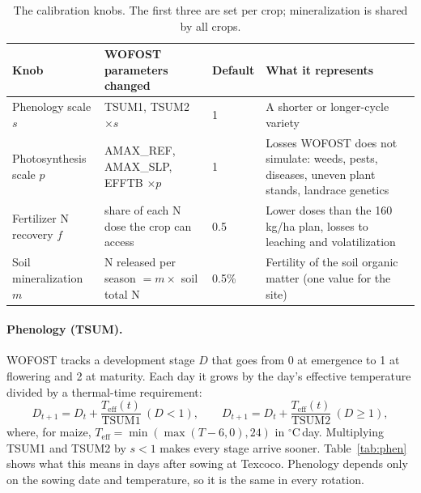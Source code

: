 \documentclass[11pt,a4paper]{article}
\begin{document}
\begin{table}[H]
\centering\small
\begin{tabularx}{\linewidth}{lllY}
\toprule
Knob & WOFOST parameters changed & Default & What it represents \\
\midrule
Phenology scale \(s\) & TSUM1, TSUM2 \(\times s\) & 1 & A shorter or longer-cycle variety \\
Photosynthesis scale \(p\) & AMAX\_REF, AMAX\_SLP, EFFTB \(\times p\) & 1 & Losses WOFOST does not simulate: weeds,
  pests, diseases, uneven plant stands, landrace genetics \\
Fertilizer N recovery \(f\) & share of each N dose the crop can access & 0.5 & Lower doses than the 160 kg/ha plan,
  losses to leaching and volatilization \\
Soil mineralization \(m\) & N released per season \(= m \times\) soil total N & 0.5\% & Fertility of the soil organic
  matter (one value for the site) \\
\bottomrule
\end{tabularx}
\caption{The calibration knobs. The first three are set per crop; mineralization is shared by all crops.}
\end{table}

\paragraph{Phenology (TSUM).} WOFOST tracks a development stage \(D\) that goes from 0 at emergence to 1 at
flowering and 2 at maturity. Each day it grows by the day's effective temperature divided by a thermal-time
requirement:
\begin{equation}
  D_{t+1} = D_t + \frac{T_{\mathrm{eff}}(t)}{\mathrm{TSUM1}}\ (D<1), \qquad
  D_{t+1} = D_t + \frac{T_{\mathrm{eff}}(t)}{\mathrm{TSUM2}}\ (D\ge 1),
\end{equation}
where, for maize, \(T_{\mathrm{eff}} = \min(\max(T - 6, 0), 24)\) in \(^\circ\)C\,day. Multiplying TSUM1 and TSUM2
by \(s<1\) makes every stage arrive sooner. Table~\ref{tab:phen} shows what this means in days after sowing at
Texcoco. Phenology depends only on the sowing date and temperature, so it is the same in every rotation.
\end{document}
